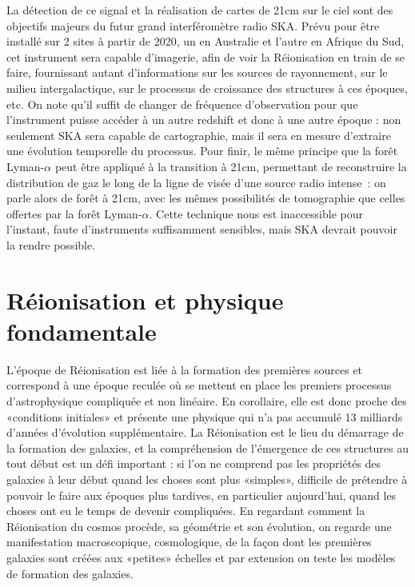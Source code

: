 La détection de ce signal et la réalisation de cartes de 21cm sur le ciel sont des objectifs majeurs du futur grand interféromètre radio SKA. Prévu pour être installé sur 2 sites à partir de 2020, un en Australie et l'autre en Afrique du Sud, cet instrument sera capable d'imagerie, afin de voir la Réionisation en train de se faire, fournissant autant d'informations sur les sources de rayonnement, sur le milieu intergalactique, sur le processus de croissance des structures à ces époques, etc. On note qu'il suffit de changer de fréquence d'observation pour que l'instrument puisse accéder à un autre redshift et donc à une autre époque : non seulement SKA sera capable de cartographie, mais il sera en mesure d'extraire une évolution temporelle du processus. Pour finir, le même principe que la forêt Lyman-$\alpha$ peut être appliqué à la transition à 21cm, permettant de reconstruire la distribution de gaz le long de la ligne de visée d'une source radio intense~: on parle alors de forêt à 21cm, avec les mêmes possibilités de tomographie que celles offertes par la forêt Lyman-$\alpha$. Cette technique nous est inaccessible pour l'instant, faute d'instruments suffisamment sensibles, mais SKA devrait pouvoir la rendre possible. 

\section{Réionisation et physique fondamentale}
L'époque de Réionisation est liée à la formation des premières sources et correspond à une époque reculée où se mettent en place les premiers processus d'astrophysique compliquée et non linéaire. En corollaire, elle est donc proche des «conditions initiales» et présente une physique qui n'a pas accumulé 13 milliards d'années d'évolution supplémentaire. La Réionisation est le lieu du démarrage de la formation des galaxies, et la compréhension de l'émergence de ces structures au tout début est un défi important : si l’on ne comprend pas les propriétés des galaxies à leur début quand les choses sont plus «simples», difficile de prétendre à pouvoir le faire aux époques plus tardives, en particulier aujourd'hui, quand les choses ont eu le temps de devenir compliquées. En regardant comment la Réionisation du cosmos procède, sa géométrie et son évolution, on regarde une manifestation macroscopique, cosmologique, de la façon dont les premières galaxies sont créées aux «petites» échelles et par extension on teste les modèles de formation des galaxies.

